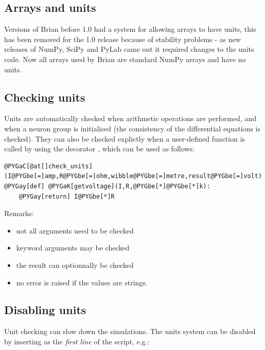 \documentclass[letterpaper,10pt]{manual}
\begin{document}
\subsection{Arrays and units}

Versions of Brian before 1.0 had a system for allowing arrays to have units, this has
been removed for the 1.0 release because of stability problems - as new releases of
NumPy, SciPy and PyLab came out it required changes to the units code. Now all arrays
used by Brian are standard NumPy arrays and have no units.


\subsection{Checking units}

Units are automatically checked when arithmetic operations are performed, and when
a neuron group is initialised (the consistency of the differential equations is checked).
They can also be checked explictly when a user-defined function is called by using the
decorator , which can be used as follows:

\begin{Verbatim}[commandchars=@\[\]]
@PYGaC[@at[]check_units](I@PYGbe[=]amp,R@PYGbe[=]ohm,wibble@PYGbe[=]metre,result@PYGbe[=]volt)
@PYGay[def] @PYGaK[getvoltage](I,R,@PYGbe[*]@PYGbe[*]k):
    @PYGay[return] I@PYGbe[*]R
\end{Verbatim}

Remarks:
\begin{itemize}
\item {} 
not all arguments need to be checked

\item {} 
keyword arguments may be checked

\item {} 
the result can optionnally be checked

\item {} 
no error is raised if the values are strings.

\end{itemize}


\subsection{Disabling units}

Unit checking can slow down the simulations. The units system can be disabled by inserting
 as the \emph{first line} of the script, e.g.:
\end{document}
